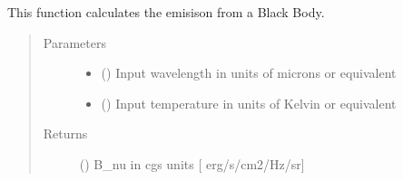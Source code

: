 \documentclass[a4paper,11pt,english]{sphinxmanual}
\begin{document}
\begin{fulllineitems}
\label{\detokenize{cascade.exoplanet_tools:cascade.exoplanet_tools.exoplanet_tools.Planck}}
This function calculates the emisison from a Black Body.
\begin{quote}\begin{description}
\item[{Parameters}] \leavevmode\begin{itemize}
\item {} 
 () \textendash{} Input wavelength in units of microns or equivalent

\item {} 
 () \textendash{} Input temperature in units of Kelvin or equivalent

\end{itemize}

\item[{Returns}] \leavevmode
{} () \textendash{} B\_nu in cgs units {[} erg/s/cm2/Hz/sr{]}

\end{description}\end{quote}

\end{fulllineitems}

\end{document}

